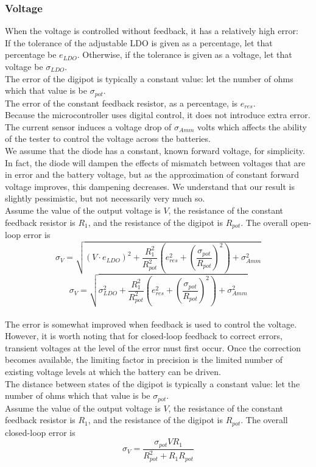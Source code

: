 \documentclass{article}
\begin{document}
\subsubsection{Voltage}
When the voltage is controlled without feedback, it has a relatively high error:\\
If the tolerance of the adjustable LDO is given as a percentage, let that percentage be $e_{LDO}$. Otherwise, if the tolerance is given as a voltage, let that voltage be $\sigma_{LDO}$.\\
The error of the digipot is typically a constant value: let the number of ohms which that value is be $\sigma_{pot}$.\\
The error of the constant feedback resistor, as a percentage, is $e_{res}$.\\
Because the microcontroller uses digital control, it does not introduce extra error.\\
The current sensor induces a voltage drop of $\sigma_{Amm}$ volts which affects the ability of the tester to control the voltage across the batteries.\\
We assume that the diode has a constant, known forward voltage, for simplicity. In fact, the diode will dampen the effects of mismatch between voltages that are in error and the battery voltage, but as the approximation of constant forward voltage improves, this dampening decreases. We understand that our result is slightly pessimistic, but not necessarily very much so.\\
Assume the value of the output voltage is $V$, the resistance of the constant feedback resistor is $R_1$, and the resistance of the digipot is $R_{pot}$. The overall open-loop error is
$$\sigma_V = \sqrt{\left(V\cdot e_{LDO}\right)^{2}+\frac{R_{1}^2}{R_{pot}^2}\left(e_{res}^{2}+\left(\frac{\sigma_{pot}}{R_{pot}}\right)^{2}\right)+\sigma_{Amm}^2}$$
$$\sigma_V = \sqrt{\sigma_{LDO}^{2}+\frac{R_{1}^2}{R_{pot}^2}\left(e_{res}^{2}+\left(\frac{\sigma_{pot}}{R_{pot}}\right)^{2}\right)+\sigma_{Amm}^2}$$
\\[12 pt]
The error is somewhat improved when feedback is used to control the voltage. However, it is worth noting that for closed-loop feedback to correct errors, transient voltages at the level of the error must first occur. Once the correction becomes available, the limiting factor in precision is the limited number of existing voltage levels at which the battery can be driven.\\
The distance between states of the digipot is typically a constant value: let the number of ohms which that value is be $\sigma_{pot}$.\\
Assume the value of the output voltage is $V$, the resistance of the constant feedback resistor is $R_1$, and the resistance of the digipot is $R_{pot}$. The overall closed-loop error is
$$\sigma_V = \frac{\sigma_{pot}VR_{1}}{R_{pot}^{2}+R_{1}R_{pot}}$$
\end{document}
